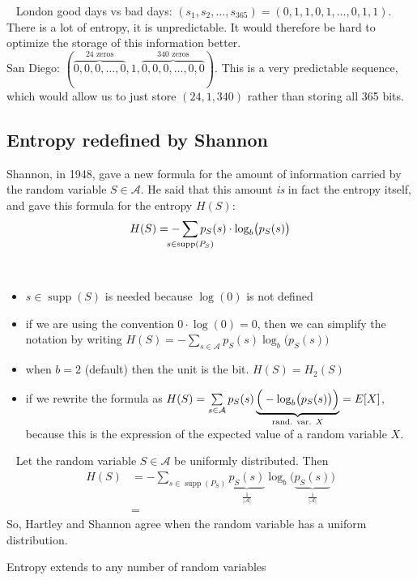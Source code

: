 \documentclass{article}
\newcommand\important[1]{\noindent {\underline{\textsc{#1}}} \ }
\DeclareMathOperator{\supp}{supp}
\begin{document}
\important{Example 2} London good days vs bad days: $(s_1, s_2, \dots, s_{365}) = (0, 1, 1, 0, 1, \dots, 0, 1, 1)$. There is a lot of entropy, it is unpredictable. It would therefore be hard to optimize the storage of this information better. \\
San Diego: $(\overbrace{0, 0, 0, \dots, 0}^{\text{24 zeros}}, 1, \overbrace{0, 0, 0, \dots, 0, 0}^{\text{340 zeros}})$. This is a very predictable sequence, which would allow us to just store $(24, 1, 340)$ rather than storing all 365 bits.

\subsection{Entropy redefined by Shannon}
Shannon, in 1948, gave a new formula for the amount of information carried by the random variable $S \in \mathcal A$. He said that this amount \emph{is} in fact the entropy itself, and gave this formula for the entropy $H(S)$:
\begin{equation}
	H(S) = -\sum_{\mathclap{s \in \supp (P_S)}} p_S(s) \cdot \log_b \bigl( p_S(s) \bigr)
\end{equation}

\important{Comments}
\begin{itemize}
	\item $s \in \supp (S)$ is needed because $\log(0)$ is not defined
	\item if we are using the convention $0 \cdot \log(0) = 0$, then we can simplify the notation by writing $H(S) = - \sum_{s \in \mathcal A} p_S(s) \log_b \bigl(p_S(s)\bigr)$ 
	\item when $b=2$ (default) then the unit is the bit. $H(S) = H_2(S)$
	\item if we rewrite the formula as $H(S) = \sum\limits_{s \in \mathcal A} p_S(s) \underbrace{\Bigr(-\log_b \bigl(p_S(s)\bigl) \Bigl)}_{\text{rand. var. $X$}} = E[X]$, because this is the expression of the expected value of a random variable $X$.
\end{itemize}

\important{Example} Let the random variable $S \in \mathcal A$ be uniformly distributed. Then
\begin{align*}
	H(S) &= - \sum_{s \in \supp (P_S)} \underbrace{p_S(s)}_{\frac{1}{|\mathcal A|}} \log_b \bigl( \underbrace{p_S(s)}_{\frac{1}{|\mathcal A|}} \bigr) \\
	&=
\end{align*}
So, Hartley and Shannon agree when the random variable has a uniform distribution.

Entropy extends to any number of random variables
\end{document}
